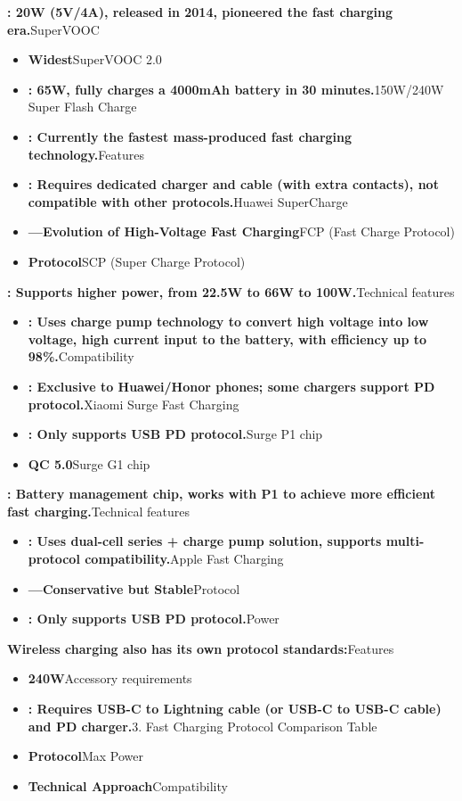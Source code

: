 \textbf{: 20W (5V/4A), released in 2014, pioneered the fast charging era.}SuperVOOC

\begin{itemize}
  \item \textbf{Widest}SuperVOOC 2.0
  \item \textbf{: 65W, fully charges a 4000mAh battery in 30 minutes.}150W/240W Super Flash Charge
  \item \textbf{: Currently the fastest mass-produced fast charging technology.}Features
  \item \textbf{: Requires dedicated charger and cable (with extra contacts), not compatible with other protocols.}Huawei SuperCharge
  \item \textbf{—Evolution of High-Voltage Fast Charging}FCP (Fast Charge Protocol)
  \item \textbf{Protocol}SCP (Super Charge Protocol)
\end{itemize}

\textbf{: Supports higher power, from 22.5W to 66W to 100W.}Technical features

\begin{itemize}
  \item \textbf{: Uses charge pump technology to convert high voltage into low voltage, high current input to the battery, with efficiency up to 98\%.}Compatibility
  \item \textbf{: Exclusive to Huawei/Honor phones; some chargers support PD protocol.}Xiaomi Surge Fast Charging
  \item \textbf{: Only supports USB PD protocol.}Surge P1 chip
  \item \textbf{QC 5.0}Surge G1 chip
\end{itemize}

\textbf{: Battery management chip, works with P1 to achieve more efficient fast charging.}Technical features

\begin{itemize}
  \item \textbf{: Uses dual-cell series + charge pump solution, supports multi-protocol compatibility.}Apple Fast Charging
  \item \textbf{—Conservative but Stable}Protocol
  \item \textbf{: Only supports USB PD protocol.}Power
\end{itemize}

\textbf{Wireless charging also has its own protocol standards:}Features

\begin{itemize}
  \item \textbf{240W}Accessory requirements
  \item \textbf{: Requires USB-C to Lightning cable (or USB-C to USB-C cable) and PD charger.}3. Fast Charging Protocol Comparison Table
  \item \textbf{Protocol}Max Power
  \item \textbf{Technical Approach}Compatibility
\end{itemize}

